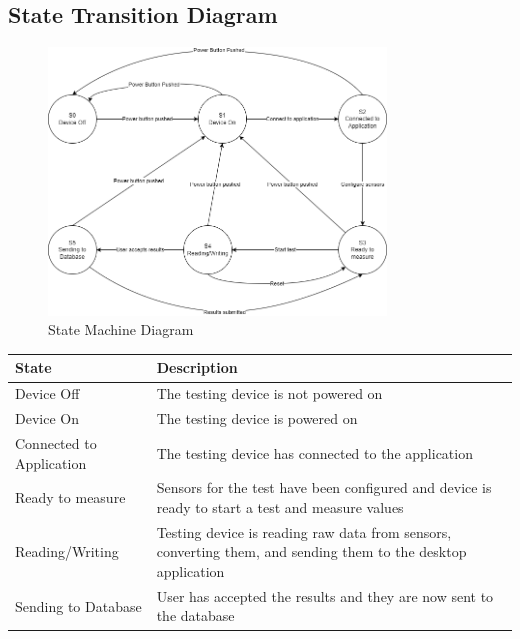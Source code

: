 \documentclass[12pt,titlepage]{article}
\begin{document}
\subsection{State Transition Diagram}
\begin{figure}[h!]
\begin{center}
\includegraphics[width=0.8\textwidth]{state_machine_diagram}
\caption{State Machine Diagram}
\label{Fig_StateMachineDiagram} 
\end{center}
\end{figure}

\begin{tabular}{| p{} | p{}|}
  \hline
  \rowcolor[gray]{0.9}
  State & Description \\
  \hline
  Device Off & The testing device is not powered on\\
  \hline
  Device On &  The testing device is powered on\\
  \hline
  Connected to Application & The testing device has connected to the application \\
  \hline
  Ready to measure & Sensors for the test have been configured and device is ready to start a test and measure values \\
  \hline
  Reading/Writing & Testing device is reading raw data from sensors, converting them, and sending them to the desktop application \\
  \hline
  Sending to Database & User has accepted the results and they are now sent to the database \\
  \hline
\end{tabular}
\end{document}
